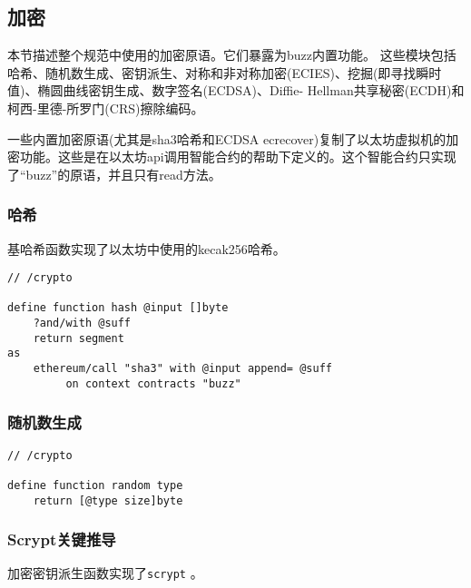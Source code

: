 \subsection{加密\statusgreen}\label{spec:format:crypto}

本节描述整个规范中使用的加密原语。它们暴露为buzz内置功能。
这些模块包括哈希、随机数生成、密钥派生、对称和非对称加密(ECIES)、挖掘(即寻找瞬时值)、椭圆曲线密钥生成、数字签名(ECDSA)、Diffie- Hellman共享秘密(ECDH)和柯西-里德-所罗门(CRS)擦除编码。

一些内置加密原语(尤其是sha3哈希和ECDSA ecrecover)复制了以太坊虚拟机的加密功能。这些是在以太坊api调用智能合约的帮助下定义的。这个智能合约只实现了“buzz”的原语，并且只有read方法。

\subsubsection{哈希}

基哈希函数实现了以太坊中使用的kecak256哈希。

\begin{definition}[Hashing]\label{def:hash}
\begin{lstlisting}[language=buzz1]
// /crypto

define function hash @input []byte
    ?and/with @suff
    return segment
as
    ethereum/call "sha3" with @input append= @suff
         on context contracts "buzz" 
\end{lstlisting}
\end{definition}  


\subsubsection{随机数生成}

\begin{definition}\label{def:rng}
\begin{lstlisting}[language=buzz1]
// /crypto

define function random type 
    return [@type size]byte 

\end{lstlisting}
\end{definition}    


\subsubsection{Scrypt关键推导}

加密密钥派生函数实现了\lstinline{scrypt} \cite{percival2009stronger}。

